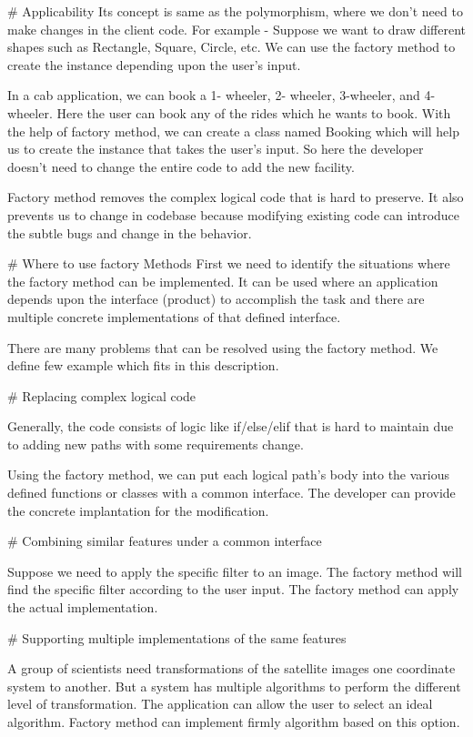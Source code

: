# Applicability
Its concept is same as the polymorphism, where we don't need to make changes in the client code. For example - Suppose we want to draw different shapes such as Rectangle, Square, Circle, etc. We can use the factory method to create the instance depending upon the user's input.

In a cab application, we can book a 1- wheeler, 2- wheeler, 3-wheeler, and 4-wheeler. Here the user can book any of the rides which he wants to book. With the help of factory method, we can create a class named Booking which will help us to create the instance that takes the user's input. So here the developer doesn't need to change the entire code to add the new facility.

Factory method removes the complex logical code that is hard to preserve. It also prevents us to change in codebase because modifying existing code can introduce the subtle bugs and change in the behavior.


# Where to use factory Methods
First we need to identify the situations where the factory method can be implemented. It can be used where an application depends upon the interface (product) to accomplish the task and there are multiple concrete implementations of that defined interface.

There are many problems that can be resolved using the factory method. We define few example which fits in this description.


# Replacing complex logical code

Generally, the code consists of logic like if/else/elif that is hard to maintain due to adding new paths with some requirements change.

Using the factory method, we can put each logical path's body into the various defined functions or classes with a common interface. The developer can provide the concrete implantation for the modification.


# Combining similar features under a common interface

Suppose we need to apply the specific filter to an image. The factory method will find the specific filter according to the user input. The factory method can apply the actual implementation.


# Supporting multiple implementations of the same features

A group of scientists need transformations of the satellite images one coordinate system to another. But a system has multiple algorithms to perform the different level of transformation. The application can allow the user to select an ideal algorithm. Factory method can implement firmly algorithm based on this option.


